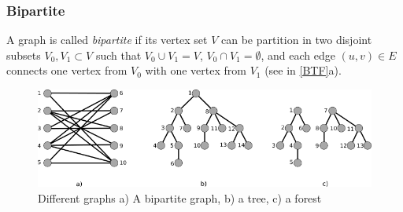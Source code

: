 \subsubsection{Bipartite}
A graph is called \textit{bipartite} if its vertex set $V$ can be partition in two disjoint subsets $V_0, V_1 \subset V$ such that $V_0 \cup V_1 = V$, $V_0 \cap V_1 = \emptyset$, and each edge $(u,v) \in E$ connects one vertex from $V_0$ with one vertex from $V_1$ (see in \autoref{BTF}a).\\

\begin{figure}[h!]
\begin{center}
\includegraphics[width= \textwidth]{figures/BipartiteTreeForest.png}
\caption{Different graphs a) A bipartite graph, b) a tree, c) a forest}
\label{BTF}
\end{center}
\end{figure}

